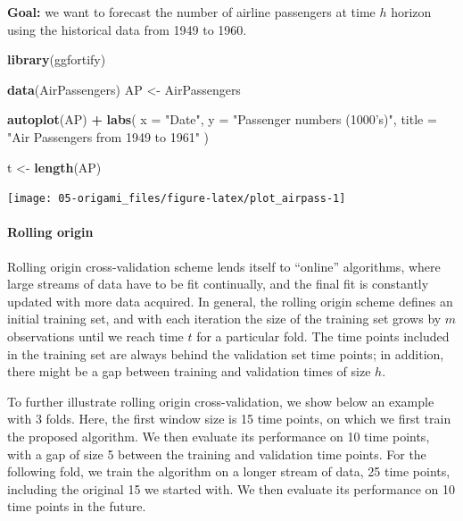 \documentclass[12pt, krantz2,]{krantz}
\newenvironment{Shaded}{\begin{snugshade}}{\end{snugshade}}
\newcommand{\DataTypeTok}[1]{\textcolor[rgb]{0.27,0.27,0.27}{#1}}
\newcommand{\KeywordTok}[1]{\textcolor[rgb]{0.27,0.27,0.27}{\textbf{#1}}}
\newcommand{\NormalTok}[1]{#1}
\newcommand{\OperatorTok}[1]{\textcolor[rgb]{0.43,0.43,0.43}{\textbf{#1}}}
\newcommand{\StringTok}[1]{\textcolor[rgb]{0.5,0.5,0.5}{#1}}
\let\oldparagraph\paragraph
\renewcommand{\paragraph}[1]{\oldparagraph{#1}\mbox{}}
\theoremstyle{definition}
\theoremstyle{definition}
\theoremstyle{definition}
\newcommand{\1}{\mathbbm{1}}
\begin{document}
\textbf{Goal:} we want to forecast the number of airline passengers at time \(h\)
horizon using the historical data from 1949 to 1960.

\begin{Shaded}
\begin{Highlighting}[]
\KeywordTok{library}\NormalTok{(ggfortify)}

\KeywordTok{data}\NormalTok{(AirPassengers)}
\NormalTok{AP <-}\StringTok{ }\NormalTok{AirPassengers}

\KeywordTok{autoplot}\NormalTok{(AP) }\OperatorTok{+}
\StringTok{  }\KeywordTok{labs}\NormalTok{(}
    \DataTypeTok{x =} \StringTok{"Date"}\NormalTok{,}
    \DataTypeTok{y =} \StringTok{"Passenger numbers (1000's)"}\NormalTok{,}
    \DataTypeTok{title =} \StringTok{"Air Passengers from 1949 to 1961"}
\NormalTok{  )}

\NormalTok{t <-}\StringTok{ }\KeywordTok{length}\NormalTok{(AP)}
\end{Highlighting}
\end{Shaded}

\begin{center}\texttt{[image: 05-origami\_files/figure-latex/plot\_airpass-1]} \end{center}

\hypertarget{rolling-origin}{%
\paragraph{Rolling origin}\label{rolling-origin}}

Rolling origin cross-validation scheme lends itself to ``online'' algorithms,
where large streams of data have to be fit continually, and the final fit is
constantly updated with more data acquired. In general, the rolling origin
scheme defines an initial training set, and with each iteration the size of the
training set grows by \(m\) observations until we reach time \(t\) for a particular
fold. The time points included in the training set are always behind the
validation set time points; in addition, there might be a gap between training
and validation times of size \(h\).

To further illustrate rolling origin cross-validation, we show below an example
with 3 folds. Here, the first window size is 15 time points, on which we first
train the proposed algorithm. We then evaluate its performance on 10 time
points, with a gap of size 5 between the training and validation time points.
For the following fold, we train the algorithm on a longer stream of data, 25
time points, including the original 15 we started with. We then evaluate its
performance on 10 time points in the future.
\end{document}
